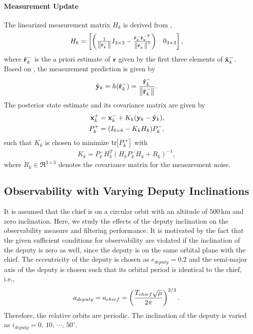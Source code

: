 \paragraph{Measurement Update}
The linearized measurement matrix $H_k$ is derived from ,
\begin{align}
H_k=
\begin{bmatrix}
\left(\frac1{\left\| \hat {\mathbf{r}}_{k}^- \right\|}I_{3\times3}-\frac{\hat {\mathbf{r}}_{k}^-{\hat {\mathbf{r}}_{k}^{-T}}}{\left\| \hat {\mathbf{r}}_{k}^- \right\|^3}\right) & 0_{3\times3}
\end{bmatrix},
\end{align}
where $\hat {\mathbf{r}}_{k}^-$ is the a priori estimate of $\mathbf{r}$ given by the first three elements of $\hat {\mathbf{x}}_{k}^-$.
Based on , the measurement prediction is given by
\begin{align}
\hat{\mathbf{y}}_k=h(\hat {\mathbf{r}}_{k}^-)=\frac{\hat {\mathbf{r}}_{k}^-}{\left\| \hat {\mathbf{r}}_{k}^- \right\|}.
\end{align}
The posterior state estimate and its covariance matrix are given by
\begin{align}
\mathbf{x}^+_k&=\mathbf{x}^-_k+K_k(\mathbf{y}_k-\hat{\mathbf{y}}_k),
\\
P^+_k&=(I_{6\times6}-K_kH_k)P^-_k,
\end{align}
such that $K_k$ is chosen to minimize $\mathrm{tr}\negthickspace\left[ P^+_k \right]$ with
\begin{align}
K_k=P^-_kH_k^T(H_kP^-_kH_k+R_k)^{-1},
\end{align}
where $R_k\in\Re^{3\times 3}$ denotes the covariance matrix for the measurement noise.

\subsection{Observability with Varying Deputy Inclinations}

It is assumed that the chief is on a circular orbit with an altitude of $500\,\mathrm{km}$ and zero inclination. Here, we study the effects of the deputy inclination on the observability measure and filtering performance. It is motivated by the fact that the given sufficient conditions for observability are violated if the inclination of the deputy is zero as well, since the deputy is on the same orbital plane with the chief. The eccentricity of the deputy is chosen as $e_{deputy}=0.2$ and the semi-major axis of the deputy is chosen such that its orbital period is identical to the chief, i.e.,
\begin{align*}
a_{deputy} = a_{chief} = \left( \frac{T_{chief}\sqrt{\mu}}{2\pi} \right)^{2/3}.
\end{align*}
Therefore, the relative orbits are periodic. The inclination of the deputy is varied as $i_{deputy}=0,\,10,\,\cdots,\,50^\circ$. 

